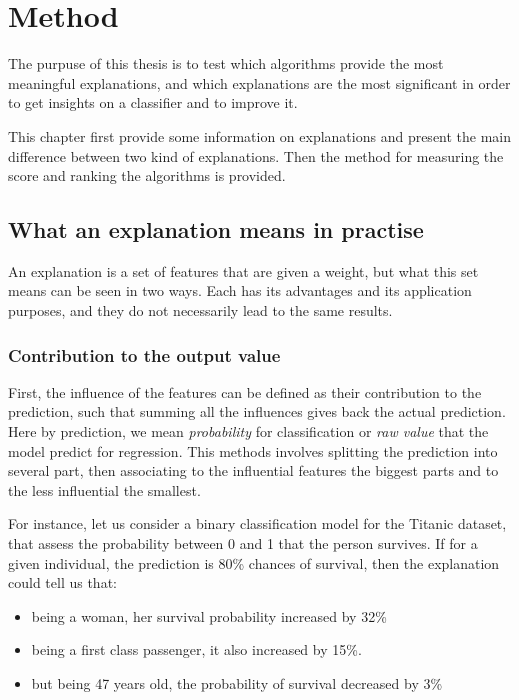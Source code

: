 \documentclass[a4paper,11pt]{kth-mag}
\begin{document}
\chapter{Method}

The purpuse of this thesis is to test which algorithms provide the most meaningful explanations, and which explanations are the most significant in order to get insights on a classifier and to improve it.

This chapter first provide some information on explanations and present the main difference between two kind of explanations. Then the method for measuring the score and ranking the algorithms is provided.

\section{What an explanation means in practise}

An explanation is a set of features that are given a weight, but what this set means can be seen in two ways. Each has its advantages and its application purposes, and they do not necessarily lead to the same results.

\subsection{Contribution to the output value}

First, the influence of the features can be defined as their contribution to the prediction, such that summing all the influences gives back the actual prediction. Here by prediction, we mean \textit{probability} for classification or \textit{raw value} that the model predict for regression. This methods involves splitting the prediction into several part, then associating to the influential features the biggest parts and to the less influential the smallest.

For instance, let us consider a binary classification model for the Titanic dataset, that assess the probability between 0 and 1 that the person survives.
If for a given individual, the prediction is 80\% chances of survival, then the explanation could tell us that:

\begin{itemize}
\item being a woman, her survival probability increased by 32\%
\item being a first class passenger, it also increased by 15\%.
\item but being 47 years old, the probability of survival decreased by 3\%
\end{itemize}
\end{document}

